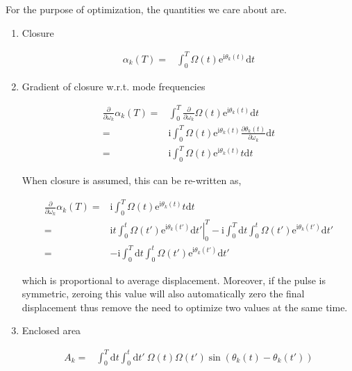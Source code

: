 \documentclass[10pt,fleqn]{article}
\newcommand{\ud}{\mathrm{d}}
\newcommand{\ue}{\mathrm{e}}
\newcommand{\ui}{\mathrm{i}}
\newcommand{\eqar}[1]
{
  \begin{align*}
    #1
  \end{align*}
}
\begin{document}
For the purpose of optimization, the quantities we care about are.
\begin{enumerate}
\item Closure
  \eqar{
    \alpha_k(T)=&\int_0^T\Omega(t)\ue^{\ui\theta_k(t)}\ud t
  }
\item Gradient of closure w.r.t. mode frequencies
  \eqar{
    \frac{\partial}{\partial\omega_k}\alpha_k(T)=&\int_0^T\frac{\partial}{\partial\omega_k}\Omega(t)\ue^{\ui\theta_k(t)}\ud t\\
    =&\ui\int_0^T\Omega(t)\ue^{\ui\theta_k(t)}\frac{\partial\theta_k(t)}{\partial\omega_k}\ud t\\
    =&\ui\int_0^T\Omega(t)\ue^{\ui\theta_k(t)}t\ud t
  }
  When closure is assumed, this can be re-written as,
  \eqar{
    \frac{\partial}{\partial\omega_k}\alpha_k(T)=&\ui\int_0^T\Omega(t)\ue^{\ui\theta_k(t)}t\ud t\\
    =&\ui\left.t\int_0^t\Omega(t')\ue^{\ui\theta_k(t')}\ud t'\right|_0^T-\ui\int_0^T\ud t\int_0^t\Omega(t')\ue^{\ui\theta_k(t')}\ud t'\\
    =&-\ui\int_0^T\ud t\int_0^t\Omega(t')\ue^{\ui\theta_k(t')}\ud t'
  }
  which is proportional to average displacement.
  Moreover, if the pulse is symmetric, zeroing this value will also automatically
  zero the final displacement thus remove the need to optimize
  two values at the same time.
\item Enclosed area
  \eqar{
    A_k=&\int_0^T\!\!\ud t\int_0^t\!\!\ud t'
    \ \Omega(t)\Omega(t')\sin(\theta_k(t)-\theta_k(t'))
  }
\end{enumerate}
\end{document}
